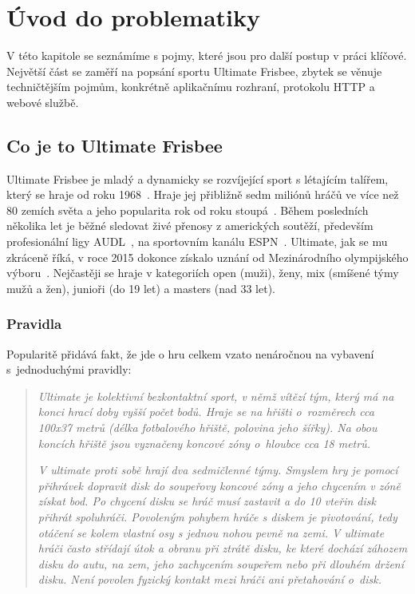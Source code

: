 \chapter{Úvod do problematiky}

V této kapitole se seznámíme s pojmy, které jsou pro další postup v práci klíčové. 
Největší část se zaměří na popsání sportu Ultimate Frisbee, zbytek se věnuje techničtějším pojmům,
konkrétně aplikačnímu rozhraní, protokolu HTTP a webové službě.

\section{Co je to Ultimate Frisbee}

Ultimate Frisbee je mladý a dynamicky se rozvíjející sport s létajícím talířem,
který se hraje od roku 1968~\cite{cald_ultimate}. Hraje jej přibližně sedm miliónů
hráčů ve více než 80 zemích světa a jeho popularita rok od roku stoupá~\cite{usa_ultimate}.
Během posledních několika let je běžné sledovat živé přenosy z amerických soutěží,
především profesionální ligy AUDL~\cite{audl}, na sportovním kanálu ESPN~\cite{espn}.
Ultimate, jak se mu zkráceně říká, v roce 2015 dokonce získalo
uznání od Mezinárodního olympijského výboru~\cite{cald_uznani}. Nejčastěji se hraje v kategoriích
open (muži), ženy, mix (smíšené týmy mužů a žen), junioři (do 19 let) a masters (nad 33 let).

\subsection{Pravidla}

Popularitě přidává fakt, že jde o hru celkem vzato nenáročnou na vybavení s~jednoduchými pravidly:

\begin{quote}
  \textit{
    Ultimate je kolektivní bezkontaktní sport, v němž vítězí tým, který má na konci hrací doby
    vyšší počet bodů. Hraje se na hřišti o~rozměrech cca 100x37 metrů (délka fotbalového hřiště,
    polovina jeho šířky). Na obou koncích hřiště jsou vyznačeny koncové zóny o~hloub\-ce cca 18 metrů.
  }
  
  \textit{
    V ultimate proti sobě hrají dva sedmičlenné týmy. Smyslem hry je pomocí přihrávek dopravit disk
    do soupeřovy koncové zóny a jeho chycením v zóně získat bod. Po chycení disku se hráč musí
    zastavit a do 10 vteřin disk přihrát spoluhráči. Povoleným pohybem hráče s diskem je pivotování,
    tedy otáčení se kolem vlastní osy s jednou nohou pevně na zemi. V ultimate hráči často střídají
    útok a obranu při ztrátě disku, ke které dochází záhozem disku do autu, na zem, jeho zachycením
    soupeřem nebo při dlouhém držení disku. Není povolen fyzický kontakt mezi hráči ani přetahování
    o~disk.~\cite{cald_ultimate}
  }
\end{quote}


